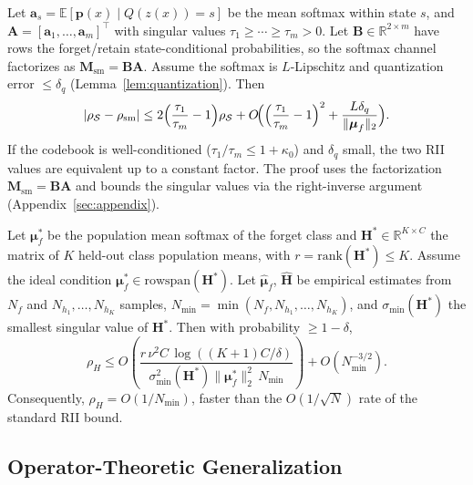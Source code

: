 \documentclass[smallextended]{svjour3}       %
\begin{document}
\begin{theorem}
\label{thm:state_bridge}
Let $\mathbf{a}_s = \mathbb{E}[\mathbf{p}(x) \mid Q(z(x))=s]$ be the mean softmax within state $s$, and $\mathbf{A} = [\mathbf{a}_1,\dots,\mathbf{a}_m]^\top$ with singular values $\tau_1 \ge \cdots \ge \tau_m > 0$. Let $\mathbf{B}\in\mathbb{R}^{2\times m}$ have rows the forget/retain state-conditional probabilities, so the softmax channel factorizes as $\mathbf{M}_{\mathrm{sm}}=\mathbf{B}\mathbf{A}$. Assume the softmax is $L$-Lipschitz and quantization error $\le \delta_q$ (Lemma~\ref{lem:quantization}). Then
\begin{equation}
|\rho_{\mathcal{S}} - \rho_{\mathrm{sm}}| \le 2\Bigl(\frac{\tau_1}{\tau_m}-1\Bigr)\rho_{\mathcal{S}} + O\!\Bigl(\Bigl(\frac{\tau_1}{\tau_m}-1\Bigr)^2 + \frac{L\delta_q}{\|\boldsymbol{\mu}_f\|_2}\Bigr).
\end{equation}
If the codebook is well-conditioned ($\tau_1/\tau_m \le 1+\kappa_0$) and $\delta_q$ small, the two RII values are equivalent up to a constant factor. The proof uses the factorization $\mathbf{M}_{\mathrm{sm}}=\mathbf{B}\mathbf{A}$ and bounds the singular values via the right-inverse argument (Appendix~\ref{sec:appendix}).
\end{theorem}

\begin{theorem}
\label{thm:softmax_deviation}
Let $\boldsymbol{\mu}_f^*$ be the population mean softmax of the forget class and $\mathbf{H}^* \in \mathbb{R}^{K\times C}$ the matrix of $K$ held-out class population means, with $r=\mathrm{rank}(\mathbf{H}^*)\le K$. Assume the ideal condition $\boldsymbol{\mu}_f^* \in \mathrm{rowspan}(\mathbf{H}^*)$. Let $\hat{\boldsymbol{\mu}}_f$, $\hat{\mathbf{H}}$ be empirical estimates from $N_f$ and $N_{h_1},\dots,N_{h_K}$ samples, $N_{\min} = \min(N_f,N_{h_1},\dots,N_{h_K})$, and $\sigma_{\min}(\mathbf{H}^*)$ the smallest singular value of $\mathbf{H}^*$. Then with probability $\ge 1-\delta$,
\begin{equation}
\rho_H \le O\!\left(\frac{r\,\nu^2 C\,\log((K+1)C/\delta)}{\sigma_{\min}^2(\mathbf{H}^*)\|\boldsymbol{\mu}_f^*\|_2^2\,N_{\min}}\right) + O(N_{\min}^{-3/2}).
\end{equation}
Consequently, $\rho_H = O(1/N_{\min})$, faster than the $O(1/\sqrt{N})$ rate of the standard RII bound.
\end{theorem}

\subsection{Operator-Theoretic Generalization}
\end{document}
